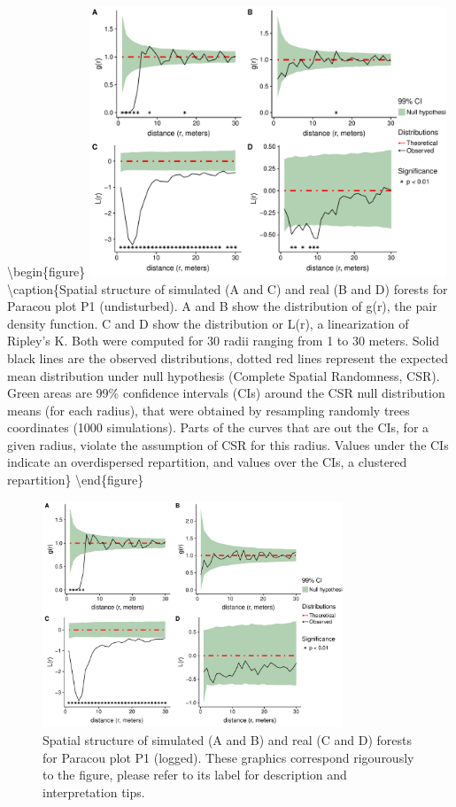 \documentclass[12pt,]{article}
\theoremstyle{definition}
\theoremstyle{definition}
\theoremstyle{definition}
\theoremstyle{remark}
\begin{document}
\textbackslash{}begin\{figure\}
\includegraphics[width=0.8\textwidth]{./plots/p01/Plot_1}
\textbackslash{}caption\{Spatial structure of simulated (A and C) and
real (B and D) forests for Paracou plot P1 (undisturbed). A and B show
the distribution of g(r), the pair density function. C and D show the
distribution or L(r), a linearization of Ripley's K. Both were computed
for 30 radii ranging from 1 to 30 meters. Solid black lines are the
observed distributions, dotted red lines represent the expected mean
distribution under null hypothesis (Complete Spatial Randomness, CSR).
Green areas are 99\% confidence intervals (CIs) around the CSR null
distribution means (for each radius), that were obtained by resampling
randomly trees coordinates (1000 simulations). Parts of the curves that
are out the CIs, for a given radius, violate the assumption of CSR for
this radius. Values under the CIs indicate an overdispersed repartition,
and values over the CIs, a clustered repartition\}\label{fig:spatialcontrol}
\textbackslash{}end\{figure\}

\begin{figure}
\includegraphics[width=0.8\textwidth]{./plots/p01/Plot_3} \caption{Spatial structure of simulated (A and B) and real (C and D) forests for Paracou plot P1 (logged). These graphics correspond rigourously to the figure, please refer to its label for description and interpretation tips.}\label{fig:spatiallogged}
\end{figure}
\end{document}
